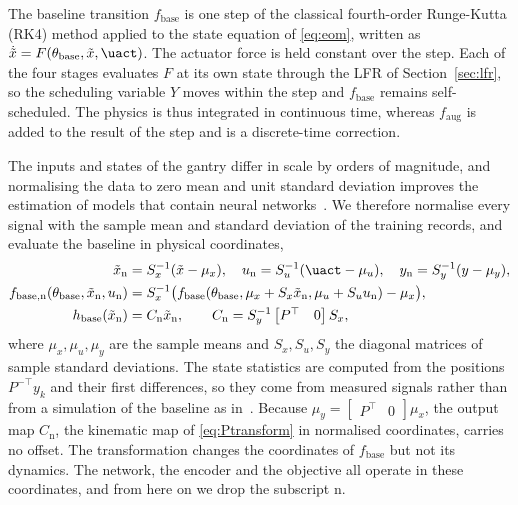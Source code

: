 The baseline transition $f_{\mathrm{base}}$ is one step of the classical
fourth-order Runge-Kutta (RK4) method applied to the state equation of
\eqref{eq:eom}, written as
$\dot{\tilde x}=F(\theta_{\mathrm{base}},\tilde x,\uact)$.
The actuator force is held constant over the step.
Each of the four stages evaluates $F$ at its own state through the LFR of
Section~\ref{sec:lfr}, so the scheduling variable $Y$ moves within the step
and $f_{\mathrm{base}}$ remains self-scheduled.
The physics is thus integrated in continuous time, whereas
$f_{\mathrm{aug}}$ is added to the result of the step and is a discrete-time
correction.

The inputs and states of the gantry differ in scale by orders of magnitude,
and normalising the data to zero mean and unit standard deviation improves
the estimation of models that contain neural
networks~\cite[Sec.~5.3]{hoekstra2026lfr}.
We therefore normalise every signal with the sample mean and standard
deviation of the training records, and evaluate the baseline in physical
coordinates,
\begin{equation}
\begin{aligned}
 \tilde x_{\mathrm n}&=S_x^{-1}(\tilde x-\mu_x),\quad
 u_{\mathrm n}=S_u^{-1}(\uact-\mu_u),\quad
 y_{\mathrm n}=S_y^{-1}(y-\mu_y),\\
 f_{\mathrm{base},\mathrm n}(\theta_{\mathrm{base}},\tilde x_{\mathrm n},u_{\mathrm n})
 &=S_x^{-1}\bigl(f_{\mathrm{base}}(\theta_{\mathrm{base}},
   \mu_x+S_x\tilde x_{\mathrm n},\mu_u+S_uu_{\mathrm n})-\mu_x\bigr),\\
 h_{\mathrm{base}}(\tilde x_{\mathrm n})&=C_{\mathrm n}\tilde x_{\mathrm n},\qquad
 C_{\mathrm n}=S_y^{-1}\begin{bmatrix}P^\top & 0\end{bmatrix}S_x,
\end{aligned}
\label{eq:aug_norm}
\end{equation}
where $\mu_x,\mu_u,\mu_y$ are the sample means and $S_x,S_u,S_y$ the diagonal
matrices of sample standard deviations.
The state statistics are computed from the positions $P^{-\top}y_k$ and their
first differences, so they come from measured signals rather than from a
simulation of the baseline as in~\cite[Sec.~5.3]{hoekstra2026lfr}.
Because $\mu_y=\begin{bmatrix}P^\top & 0\end{bmatrix}\mu_x$, the output map
$C_{\mathrm n}$, the kinematic map of \eqref{eq:Ptransform} in normalised
coordinates, carries no offset.
The transformation changes the coordinates of $f_{\mathrm{base}}$ but not its
dynamics.
The network, the encoder and the objective all operate in these coordinates,
and from here on we drop the subscript $\mathrm n$.

